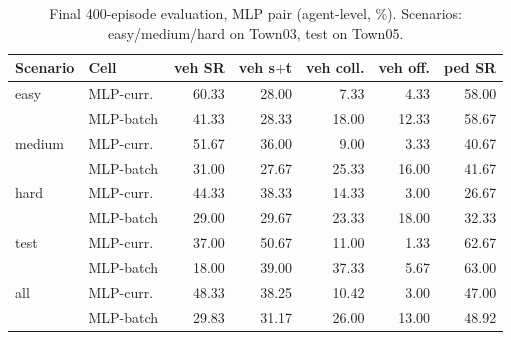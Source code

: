 \begin{table}[t]
  \centering\small
  \caption{Final 400-episode evaluation, MLP pair (agent-level, \%).
  Scenarios: easy/medium/hard on Town03, test on Town05.}
  \label{tab:eval-mlp}
  \begin{tabular}{@{}llrrrrr@{}}
    \toprule
    Scenario & Cell & veh SR & veh s$+$t & veh coll. & veh off. & ped SR \\
    \midrule
    easy   & MLP-curr.\ & 60.33 & 28.00 & 7.33 & 4.33 & 58.00 \\
           & MLP-batch  & 41.33 & 28.33 & 18.00 & 12.33 & 58.67 \\
    medium & MLP-curr.\ & 51.67 & 36.00 & 9.00 & 3.33 & 40.67 \\
           & MLP-batch  & 31.00 & 27.67 & 25.33 & 16.00 & 41.67 \\
    hard   & MLP-curr.\ & 44.33 & 38.33 & 14.33 & 3.00 & 26.67 \\
           & MLP-batch  & 29.00 & 29.67 & 23.33 & 18.00 & 32.33 \\
    test   & MLP-curr.\ & 37.00 & 50.67 & 11.00 & 1.33 & 62.67 \\
           & MLP-batch  & 18.00 & 39.00 & 37.33 & 5.67 & 63.00 \\
    \midrule
    all    & MLP-curr.\ & 48.33 & 38.25 & 10.42 & 3.00 & 47.00 \\
           & MLP-batch  & 29.83 & 31.17 & 26.00 & 13.00 & 48.92 \\
    \bottomrule
  \end{tabular}
\end{table}

